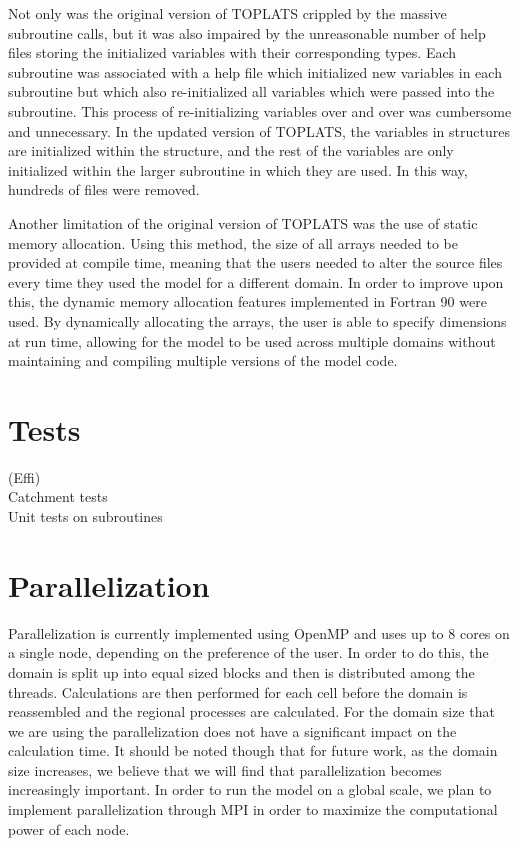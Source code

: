 \documentclass[pdftex,12pt,a4paper]{article}
\begin{document}
Not only was the original version of TOPLATS crippled by the massive subroutine calls, but it was also impaired by the unreasonable number of help files storing the initialized variables with their corresponding types. Each subroutine was associated with a help file which initialized new variables in each subroutine but which also re-initialized all variables which were passed into the subroutine. This process of re-initializing variables over and over was cumbersome and unnecessary. In the updated version of TOPLATS, the variables in structures are initialized within the structure, and the rest of the variables are only initialized within the larger subroutine in which they are used. In this way, hundreds of files were removed.

Another limitation of the original version of TOPLATS was the use of static memory allocation. Using this method, the size of all arrays needed to be provided at compile time, meaning that the users needed to alter the source files every time they used the model for a different domain. In order to improve upon this, the dynamic memory allocation features implemented in Fortran 90 were used. By dynamically allocating the arrays, the user is able to specify dimensions at run time, allowing for the model to be used across multiple domains without maintaining and compiling multiple versions of the model code.

\section{Tests}
{(Effi)}
{\\ Catchment tests\\ Unit tests on subroutines}

\section{Parallelization}
Parallelization is currently implemented using OpenMP and uses up to 8 cores on a single node, depending on the preference of the user.  In order to do this, the domain is split up into equal sized blocks and then is distributed among the threads. Calculations are then performed for each cell before the domain is reassembled and the regional processes are calculated. For the domain size that we are using the parallelization does not have a significant impact on the calculation time. It should be noted though that for future work, as the domain size increases, we believe that we will find that parallelization becomes increasingly important. In order to run the model on a global scale, we plan to implement parallelization through MPI in order to maximize the computational power of each node.
\end{document}
